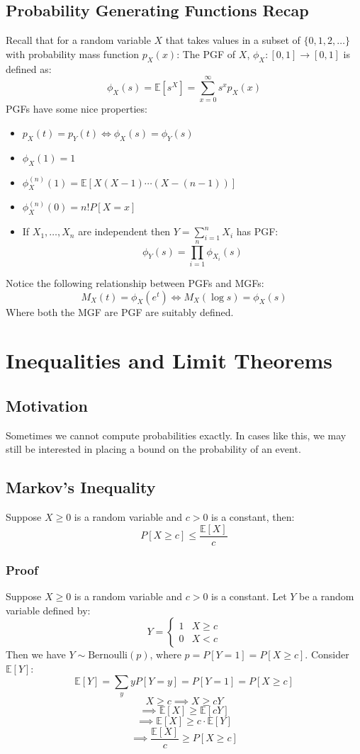 \documentclass[12pt]{article}
\begin{document}
\subsection{Probability Generating Functions Recap}
Recall that for a random variable \(X\) that takes values in a subset of \(\{0,1,2,\dots\}\) with probability mass function \(p_X(x)\): The PGF of \(X\), \(\phi_X:[0,1]\to[0,1]\) is defined as:
\[\phi_X(s)=\mathbb{E}[s^X]=\sum^\infty_{x=0}s^xp_X(x)\]
PGFs have some nice properties:
\begin{itemize}
    \item \(p_X(t)=p_Y(t)\iff\phi_X(s)=\phi_Y(s)\)
    \item \(\phi_X(1)=1\)
    \item \(\phi^{(n)}_X(1)=\mathbb{E}[X(X-1)\cdots(X-(n-1))]\)
    \item \(\phi^{(n)}_X(0)=n!P[X=x]\)
    \item If \(X_1,\dots,X_n\) are independent then \(Y=\sum^n_{i=1}X_i\) has PGF:
    \[\phi_Y(s)=\prod^n_{i=1}\phi_{X_i}(s)\]
\end{itemize}
Notice the following relationship between PGFs and MGFs:
\[M_X(t)=\phi_X(e^t)\iff M_X(\log s)=\phi_X(s)\]
Where both the MGF are PGF are suitably defined.
\clearpage
\section{Inequalities and Limit Theorems}
\subsection{Motivation}
Sometimes we cannot compute probabilities exactly. In cases like this, we may still be interested in placing a bound on the probability of an event.
\subsection{Markov's Inequality}
Suppose \(X\geq 0\) is a random variable and \(c>0\) is a constant, then:
\[P[X\geq c]\leq\frac{\mathbb{E}[X]}{c}\]
\subsubsection{Proof}
Suppose \(X\geq 0\) is a random variable and \(c>0\) is a constant. Let \(Y\) be a random variable defined by:
\[Y=\begin{cases}
    1 & X\geq c \\
    0 & X < c
\end{cases}\]
Then we have \(Y\sim\text{Bernoulli}(p)\), where \(p=P[Y=1]=P[X\geq c]\). Consider \(\mathbb{E}[Y]\):
\[\mathbb{E}[Y]=\sum_yyP[Y=y]=P[Y=1]=P[X\geq c]\]
\[X\geq c\implies X\geq cY\]
\[\implies \mathbb{E}[X]\geq \mathbb{E}[cY]\]
\[\implies\mathbb{E}[X]\geq c\cdot\mathbb{E}[Y]\]
\[\implies \frac{\mathbb{E}[X]}{c}\geq P[X\geq c]\]
\end{document}
